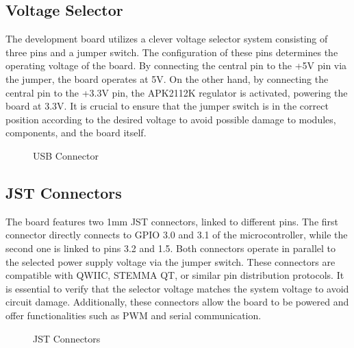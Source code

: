\documentclass[letterpaper,10pt,english]{sphinxmanual}
\begin{document}
\subsection{Voltage Selector}
\label{\detokenize{generalboardcontrol:voltage-selector}}
\sphinxAtStartPar
The development board utilizes a clever voltage selector system consisting of three pins and a jumper switch. The configuration of these pins determines the operating voltage of the board. By connecting the central pin to the +5V pin via the jumper, the board operates at 5V. On the other hand, by connecting the central pin to the +3.3V pin, the APK2112K regulator is activated, powering the board at 3.3V. It is crucial to ensure that the jumper switch is in the correct position according to the desired voltage to avoid possible damage to modules, components, and the board itself.

\begin{figure}[htbp]
\centering
\capstart

\noindent{}
\caption{USB Connector}\label{\detokenize{generalboardcontrol:id2}}\label{\detokenize{generalboardcontrol:selector}}\end{figure}


\subsection{JST Connectors}
\label{\detokenize{generalboardcontrol:jst-connectors}}
\sphinxAtStartPar
The board features two 1mm JST connectors, linked to different pins. The first connector directly connects to GPIO 3.0 and 3.1 of the microcontroller, while the second one is linked to pins 3.2 and 1.5. Both connectors operate in parallel to the selected power supply voltage via the jumper switch. These connectors are compatible with QWIIC, STEMMA QT, or similar pin distribution protocols. It is essential to verify that the selector voltage matches the system voltage to avoid circuit damage. Additionally, these connectors allow the board to be powered and offer functionalities such as PWM and serial communication.

\begin{figure}[htbp]
\centering
\capstart

\noindent{}
\caption{JST Connectors}\label{\detokenize{generalboardcontrol:id3}}\label{\detokenize{generalboardcontrol:jst}}\end{figure}
\end{document}
